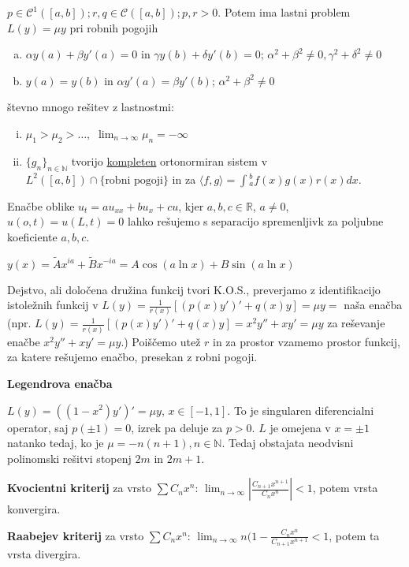 \documentclass[10pt,a4paper]{amsart}
\theoremstyle{definition} %
\theoremstyle{plain} %
\let\oldint\int
\renewcommand{\int}{\oldint \!}
\newcommand{\R}{\mathbb R}
\newcommand{\N}{\mathbb N}
\begin{document}
$p \in \mathcal{C}^1([a,b]); r,q \in \mathcal{C}([a,b]); p,r > 0$. Potem ima lastni problem $L(y) = \mu y$ pri robnih pogojih
\vspace{-0.2cm}
\begin{enumerate}[a)]
\item $\alpha y(a) + \beta y'(a) = 0$ in $\gamma y(b) +  \delta y'(b) = 0$; $\alpha^2 + \beta^2 \neq 0, \gamma^2 + \delta^2 \neq 0$
\item $y(a) = y(b)$ in $\alpha y'(a) = \beta y'(b)$; $\alpha^2+\beta^2 \neq 0$
\end{enumerate}
števno mnogo rešitev z lastnostmi:
\begin{enumerate}[i)]
\item $\mu_1 > \mu_2 > \ldots, $ $\lim_{n\rightarrow \infty}\mu_n = -\infty$
\item $\{g_n\}_{n\in \N}$ tvorijo \underline{kompleten} ortonormiran sistem v $L^2([a,b])\cap \{\text{robni pogoji}\}$ in za $ \langle f,g \rangle = \int_a^b f(x)g(x)r(x)dx$.
\end{enumerate}

Enačbe oblike $u_t = au_{xx} + bu_x + cu$, kjer $a,b,c \in \R$, $a\neq 0$, $u(o,t) = u(L,t) = 0$ lahko rešujemo s separacijo spremenljivk za poljubne koeficiente $a,b,c$.

$y(x) = \tilde{A}x^{ia} + \tilde{B}x^{-ia} = A\cos{(a\ln{x})} + B\sin{(a\ln{x})}$

Dejstvo, ali določena družina funkcij tvori K.O.S., preverjamo z identifikacijo istoležnih funkcij v $L(y) = \frac{1}{r(x)}[(p(x)y')'+q(x)y] = \mu y =$ naša enačba (npr.  $L(y) = \frac{1}{r(x)}[(p(x)y')'+q(x)y] = x^2y'' + xy' = \mu y$ za reševanje enačbe $ x^2y'' + xy' = \mu y$.) Poiščemo utež $r$ in za prostor vzamemo prostor funkcij, za katere rešujemo enačbo, presekan z robni pogoji.

\textbf{Legendrova enačba}

$L(y) = ((1-x^2)y')'=\mu y$, $x \in [-1,1]$. To je singularen diferencialni operator, saj $p(\pm 1) = 0$, izrek pa deluje za $p > 0$. $L$ je omejena v $x = \pm 1$ natanko tedaj, ko je $\mu = -n(n+1), n \in \N$. Tedaj obstajata neodvisni polinomski rešitvi stopenj $2m$ in $2m+1$.

\textbf{Kvocientni kriterij} za vrsto $\sum C_n x^n$: $\lim_{n\rightarrow \infty}\left| \frac{C_{n+1} x^{n+1}}{C_n x^{n}}\right| < 1$, potem vrsta konvergira.

\textbf{Raabejev kriterij} za vrsto $\sum C_n x^n$: $\lim_{n\rightarrow \infty}n(1-\frac{C_nx^n}{C_{n+1}x^{n+1}} < 1$, potem ta vrsta divergira.
\end{document}
